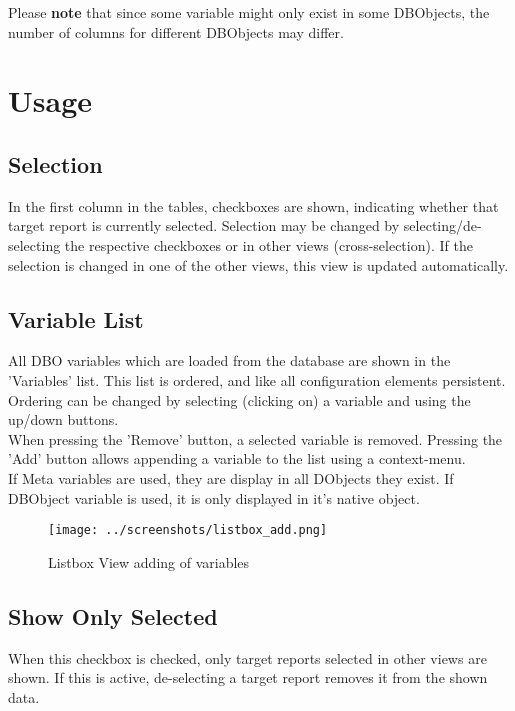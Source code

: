 Please \textbf{note} that since some variable might only exist in some DBObjects, the number of columns for different DBObjects may differ. \\

\section{Usage}

\subsection{Selection}
In the first column in the tables, checkboxes are shown, indicating whether that target report is currently selected. Selection may be changed by selecting/de-selecting the respective checkboxes or in other views (cross-selection). If the selection is changed in one of the other views, this view is updated automatically.


\subsection{Variable List}
All DBO variables which are loaded from the database are shown in the 'Variables' list. This list is ordered, and like all configuration elements persistent. Ordering can be changed by selecting (clicking on) a variable and using the up/down buttons. \\

When pressing the 'Remove' button, a selected variable is removed.  Pressing the 'Add' button allows appending a variable to the list using a context-menu. \\

If Meta variables are used, they are display in all DObjects they exist. If DBObject variable is used, it is only displayed in it's native object.

\begin{figure}[H]
    \texttt{[image: ../screenshots/listbox\_add.png]}
  \caption{Listbox View adding of variables}
\end{figure}


\subsection{Show Only Selected}
When this checkbox is checked, only target reports selected in other views are shown. If this is active, de-selecting a target report removes it from the shown data.

